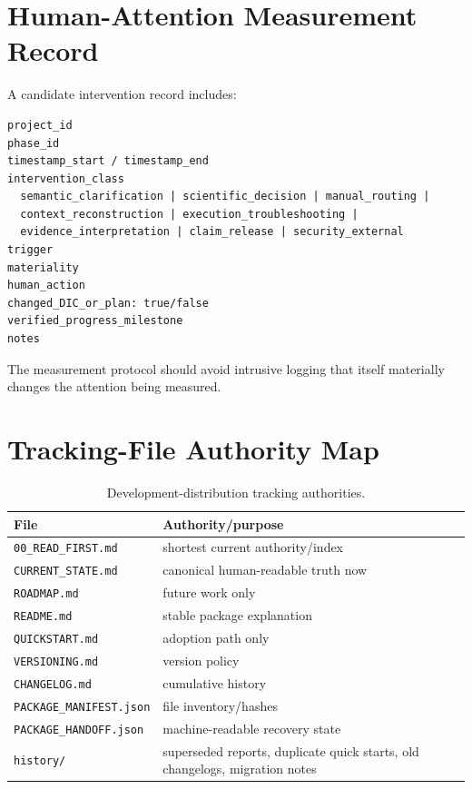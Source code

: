 \documentclass[11pt,a4paper]{article}
\begin{document}
\section{Human-Attention Measurement Record}\label{sec:attention-record}
A candidate intervention record includes:
\begin{lstlisting}[style=workflow]
project_id
phase_id
timestamp_start / timestamp_end
intervention_class
  semantic_clarification | scientific_decision | manual_routing |
  context_reconstruction | execution_troubleshooting |
  evidence_interpretation | claim_release | security_external
trigger
materiality
human_action
changed_DIC_or_plan: true/false
verified_progress_milestone
notes
\end{lstlisting}
The measurement protocol should avoid intrusive logging that itself materially changes the attention being measured.

\section{Tracking-File Authority Map}\label{sec:tracking-map}
\begin{table}[H]\centering\small
\begin{tabularx}{\textwidth}{@{}lY@{}}\toprule
File & Authority/purpose\\\midrule
\texttt{00\_READ\_FIRST.md} & shortest current authority/index\\
\texttt{CURRENT\_STATE.md} & canonical human-readable truth now\\
\texttt{ROADMAP.md} & future work only\\
\texttt{README.md} & stable package explanation\\
\texttt{QUICKSTART.md} & adoption path only\\
\texttt{VERSIONING.md} & version policy\\
\texttt{CHANGELOG.md} & cumulative history\\
\texttt{PACKAGE\_MANIFEST.json} & file inventory/hashes\\
\texttt{PACKAGE\_HANDOFF.json} & machine-readable recovery state\\
\texttt{history/} & superseded reports, duplicate quick starts, old changelogs, migration notes\\
\bottomrule\end{tabularx}
\caption{Development-distribution tracking authorities.}
\end{table}
\end{document}
